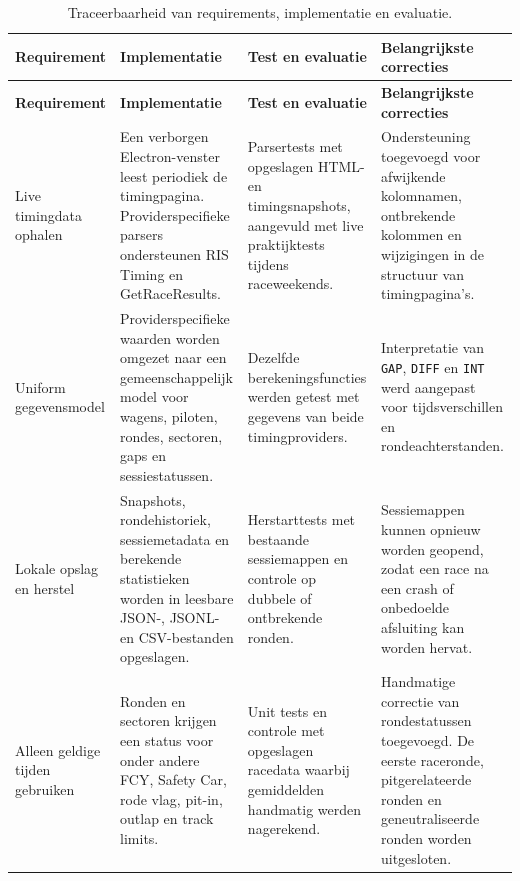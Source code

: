 \small
\begin{longtable}{@{}
  >{\raggedright\arraybackslash}p{2.8cm}
  >{\raggedright\arraybackslash}p{3.5cm}
  >{\raggedright\arraybackslash}p{3.5cm}
  >{\raggedright\arraybackslash}p{3.2cm}
@{}}
\caption{Traceerbaarheid van requirements, implementatie en evaluatie.}
\label{tab:requirements-traceability} \\

\toprule
\textbf{Requirement} &
\textbf{Implementatie} &
\textbf{Test en evaluatie} &
\textbf{Belangrijkste correcties} \\
\midrule
\endfirsthead

\toprule
\textbf{Requirement} &
\textbf{Implementatie} &
\textbf{Test en evaluatie} &
\textbf{Belangrijkste correcties} \\
\midrule
\endhead

\bottomrule
\endfoot

Live timingdata ophalen &
Een verborgen Electron-venster leest periodiek de timingpagina. Providerspecifieke parsers ondersteunen RIS Timing en GetRaceResults. &
Parsertests met opgeslagen HTML- en timingsnapshots, aangevuld met live praktijktests tijdens raceweekends. &
Ondersteuning toegevoegd voor afwijkende kolomnamen, ontbrekende kolommen en wijzigingen in de structuur van timingpagina's. \\

\addlinespace
Uniform gegevensmodel &
Providerspecifieke waarden worden omgezet naar een gemeenschappelijk model voor wagens, piloten, rondes, sectoren, gaps en sessiestatussen. &
Dezelfde berekeningsfuncties werden getest met gegevens van beide timingproviders. &
Interpretatie van \texttt{GAP}, \texttt{DIFF} en \texttt{INT} werd aangepast voor tijdsverschillen en rondeachterstanden. \\

\addlinespace
Lokale opslag en herstel &
Snapshots, rondehistoriek, sessiemetadata en berekende statistieken worden in leesbare JSON-, JSONL- en CSV-bestanden opgeslagen. &
Herstarttests met bestaande sessiemappen en controle op dubbele of ontbrekende ronden. &
Sessiemappen kunnen opnieuw worden geopend, zodat een race na een crash of onbedoelde afsluiting kan worden hervat. \\

\addlinespace
Alleen geldige tijden gebruiken &
Ronden en sectoren krijgen een status voor onder andere FCY, Safety Car, rode vlag, pit-in, outlap en track limits. &
Unit tests en controle met opgeslagen racedata waarbij gemiddelden handmatig werden nagerekend. &
Handmatige correctie van rondestatussen toegevoegd. De eerste raceronde, pitgerelateerde ronden en geneutraliseerde ronden worden uitgesloten. \\


\end{longtable}
